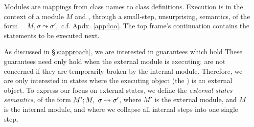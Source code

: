  Modules are mappings
from class names to class definitions. 
Execution 
is in the context of  a module $M$ and   ,
  through a small-step, unsurprising, semantics, of the form \ \ 
   $M, \sigma \leadsto \sigma'$,\  c.f. Apdx. \ref{app:loo}.
The   top frame's continuation contains the statements to be %
executed next.
 
As discussed in \S \ref{s:approach}, we are interested in guarantees which hold
 These guarantees need only hold 
when the external module is executing; \scd{we} are not concerned if they are
temporarily broken by the internal module. Therefore, we are only interested in states where the
executing object (the \prg{this}) is an external object. 
To express our focus on external states, we define the  \emph{external states semantics}, of the form 
$M' ; M,\ \sigma \leadsto \sigma'$, where $M'$ is the external
module, and $M$ is the internal module, and where we
collapse all internal steps into one single step.

 

